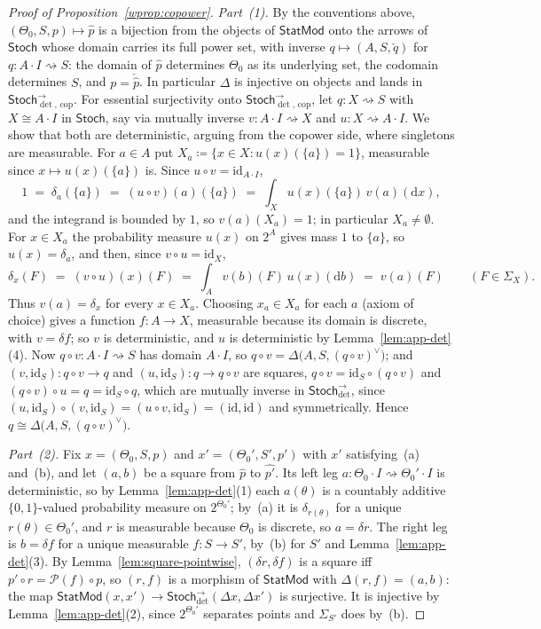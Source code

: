 \documentclass[11pt,a4paper]{article}
\theoremstyle{plain}
\theoremstyle{definition}
\theoremstyle{remark}
\newcommand{\cat}[1]{\mathsf{#1}}
\newcommand{\Stoch}{\cat{Stoch}}
\newcommand{\Prb}{\mathcal{P}}
\newcommand{\id}{\mathrm{id}}
\newcommand{\del}{\delta}
\newcommand{\StatMod}{\cat{StatMod}}
\newcommand{\Jc}{\Delta}            %
\newcommand{\Arrdet}[1]{#1^{\rightarrow}_{\det}}
\newcommand{\Arrcop}[1]{#1^{\rightarrow}_{\det,\,\mathrm{cop}}}
\begin{document}
\begin{proof}[Proof of Proposition~\ref{wprop:copower}]
\emph{Part~(1).} By the conventions above, $(\Theta_0,S,p) \mapsto
\widehat p$ is a bijection from the objects of $\StatMod$ onto the arrows of
$\Stoch$ whose domain carries its full power set, with inverse
$q \mapsto (A,S,\check q)$ for $q \colon A \cdot I \rightsquigarrow S$: the
domain of $\widehat p$ determines $\Theta_0$ as its underlying set, the
codomain determines $S$, and $p = \check{\widehat p}$. In particular $\Jc$ is
injective on objects and lands in $\Arrcop{\Stoch}$. For essential
surjectivity onto $\Arrcop{\Stoch}$, let $q \colon X \rightsquigarrow S$ with
$X \cong A \cdot I$ in $\Stoch$, say via mutually inverse
$v \colon A \cdot I \rightsquigarrow X$ and
$u \colon X \rightsquigarrow A \cdot I$. We show that both are deterministic,
arguing from the copower side, where singletons are measurable. For $a \in A$
put $X_a \coloneqq \{x \in X : u(x)(\{a\}) = 1\}$, measurable since
$x \mapsto u(x)(\{a\})$ is. Since $u \circ v = \id_{A \cdot I}$,
\[
1 \;=\; \delta_a(\{a\}) \;=\; (u \circ v)(a)(\{a\})
\;=\; \int_X u(x)(\{a\})\, v(a)(\mathrm{d}x),
\]
and the integrand is bounded by $1$, so $v(a)(X_a) = 1$; in particular
$X_a \neq \emptyset$. For $x \in X_a$ the probability measure $u(x)$ on
$2^{A}$ gives mass $1$ to $\{a\}$, so $u(x) = \delta_a$, and then, since
$v \circ u = \id_X$,
\[
\delta_x(F) \;=\; (v \circ u)(x)(F)
\;=\; \int_A v(b)(F)\, u(x)(\mathrm{d}b) \;=\; v(a)(F)
\qquad (F \in \Sigma_X).
\]
Thus $v(a) = \delta_x$ for every $x \in X_a$. Choosing $x_a \in X_a$ for each
$a$ (axiom of choice) gives a function $f \colon A \to X$, measurable because
its domain is discrete, with $v = \del f$; so $v$ is deterministic, and $u$
is deterministic by Lemma~\ref{lem:app-det}(4). Now
$q \circ v \colon A \cdot I \rightsquigarrow S$ has domain $A \cdot I$, so
$q \circ v = \Jc\bigl(A, S, (q \circ v)^{\vee}\bigr)$; and
$(v, \id_S) \colon q \circ v \to q$ and $(u, \id_S) \colon q \to q \circ v$
are squares, $q \circ v = \id_S \circ (q \circ v)$ and
$(q \circ v) \circ u = q = \id_S \circ q$, which are mutually inverse in
$\Arrdet{\Stoch}$, since $(u,\id_S) \circ (v,\id_S) = (u \circ v, \id_S) =
(\id, \id)$ and symmetrically. Hence
$q \cong \Jc\bigl(A,S,(q \circ v)^{\vee}\bigr)$.

\emph{Part~(2).} Fix $x = (\Theta_0,S,p)$ and $x' = (\Theta_0',S',p')$
with $x'$ satisfying~(a) and~(b), and let $(a,b)$ be a square from
$\widehat p$ to $\widehat{p'}$. Its left leg
$a \colon \Theta_0 \cdot I \rightsquigarrow \Theta_0' \cdot I$ is
deterministic, so by Lemma~\ref{lem:app-det}(1) each $a(\theta)$ is a
countably additive $\{0,1\}$-valued probability measure on $2^{\Theta_0'}$;
by~(a) it is $\delta_{r(\theta)}$ for a unique $r(\theta) \in \Theta_0'$, and
$r$ is measurable because $\Theta_0$ is discrete, so $a = \del r$. The right
leg is $b = \del f$ for a unique measurable $f \colon S \to S'$, by~(b) for
$S'$ and Lemma~\ref{lem:app-det}(3). By Lemma~\ref{lem:square-pointwise},
$(\del r, \del f)$ is a square iff $p' \circ r = \Prb(f) \circ p$, so
$(r,f)$ is a morphism of $\StatMod$ with $\Jc(r,f) = (a,b)$: the map
$\StatMod(x,x') \to \Arrdet{\Stoch}(\Jc x, \Jc x')$ is surjective. It is
injective by Lemma~\ref{lem:app-det}(2), since $2^{\Theta_0'}$ separates
points and $\Sigma_{S'}$ does by~(b).


\end{proof}
\end{document}
